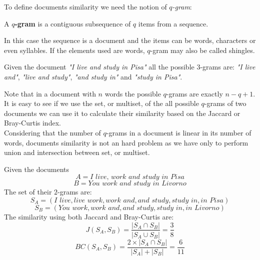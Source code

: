 To define documents similarity we need the notion of \textit{$q$-gram}:

\begin{definizione}
	A \textbf{$q$-gram} is a contiguous subsequence of $q$ items from a sequence.
\end{definizione}

In this case the sequence is a document and the items can be words, characters or even syllables. If the elements used are words, $q$-gram may also be called shingles.

\begin{esempio}
	Given the document \textit{"I live and study in Pisa"} all the possible $3$-grams are: 
	\textit{"I live and"}, \textit{"live and study"}, \textit{"and study in"} and \textit{"study in Pisa"}.
\end{esempio}

Note that in a document with $n$ words the possible $q$-grams are exactly $n-q+1$.\\

It is easy to see if we use the set, or multiset, of the all possible $q$-grams of two documents we can use it to calculate their similarity based on the Jaccard or Bray-Curtis index.\\

Considering that the number of $q$-grams in a document is linear in its number of words, documents similarity is not an hard problem as we have only to perform union and intersection between set, or multiset.\\

\begin{esempio}
	Given the documents 
	\begin{equation*}
	A = \textit{I live, work and study in Pisa}
	\end{equation*}
	\begin{equation*}
	B = \textit{You work and study in Livorno}
	\end{equation*}
	The set of their $2$-grams are:
	\begin{equation*}
	S_{A} = (\textit{I live}, \textit{live work}, \textit{work and}, \textit{and study}, \textit{study in}, \textit{in Pisa})
	\end{equation*}
	\begin{equation*}
	S_{B} = (\textit{You work}, \textit{work and}, \textit{and study}, \textit{study in}, \textit{in Livorno})
	\end{equation*}
	The similarity using both Jaccard and Bray-Curtis are:\\
	\begin{equation*}
		J(S_{A},S_{B}) = \frac{|S_{A} \cap S_{B} |}{|S_{A} \cup S_{B} |} = \frac{3}{8}
	\end{equation*}
	\begin{equation*}
		BC(S_{A},S_{B}) = \frac{2 \times |S_{A} \cap S_{B} |}{|S_{A}| +|S_{B}|} = \frac{6}{11}
	\end{equation*}
\end{esempio}

